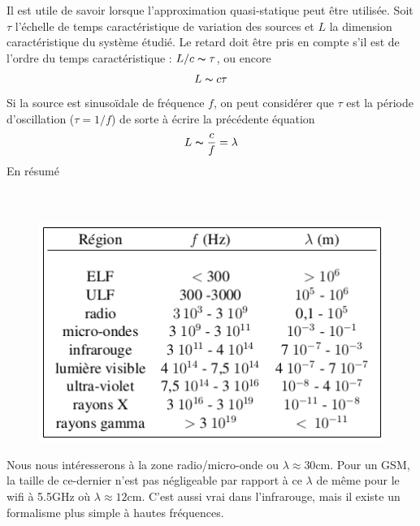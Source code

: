 \newpage
Il est utile de savoir lorsque l'approximation quasi-statique peut être utilisée. Soit 
$\tau$ l'échelle de temps caractéristique de variation des sources et $L$ la dimension 
caractéristique du système étudié. Le retard doit être pris en compte s'il est de l'ordre 
du temps caractéristique : $L/c \thicksim \tau$, ou encore
\begin{equation}
L \thicksim c\tau
\end{equation}
Si la source est sinusoïdale de fréquence $f$, on peut considérer que $\tau$ est 
la période d'oscillation ($\tau = 1/f$) de sorte à écrire la précédente équation
\begin{equation}
L \thicksim \frac{c}{f} = \lambda
\end{equation}
En résumé\\
\ \\ \\

\begin{figure}
\vspace{-5mm}
\includegraphics[scale=0.35]{ch1/image1}
\end{figure}
Nous nous intéresserons à la zone radio/micro-onde ou $\lambda\approx 30$cm. Pour un 
GSM, la taille de ce-dernier n'est pas négligeable par rapport à ce $\lambda$ de 
même pour le wifi à 5.5GHz où $\lambda\approx12$cm. C'est aussi vrai dans l'infrarouge, 
mais il existe un formalisme plus simple à hautes fréquences.\\

